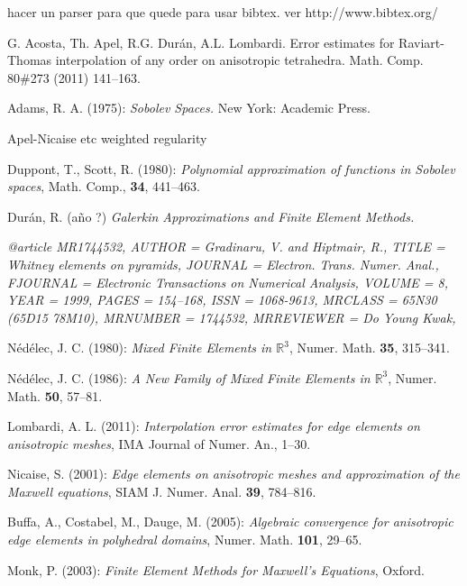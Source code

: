 \begin{thebibliography}{9}
 {\color{red} hacer un parser para que quede para usar bibtex.
ver http://www.bibtex.org/}

 G. Acosta, Th. Apel, R.G. Dur\'an, A.L. Lombardi. Error estimates for Raviart-Thomas interpolation of
any order on anisotropic tetrahedra. Math. Comp. 80\#273 (2011) 141--163. 

Adams, R. A. (1975): \emph{Sobolev Spaces.} New York: Academic Press.

Apel-Nicaise etc weighted regularity 

Duppont, T., Scott, R. (1980): \emph{Polynomial approximation of functions in Sobolev spaces},
Math. Comp., \textbf{34}, 441--463.

Dur\'an, R. (a\~no ?) \emph{Galerkin Approximations and Finite Element Methods.}

\emph{
@article {MR1744532,
    AUTHOR = {Gradinaru, V. and Hiptmair, R.},
     TITLE = {Whitney elements on pyramids},
   JOURNAL = {Electron. Trans. Numer. Anal.},
  FJOURNAL = {Electronic Transactions on Numerical Analysis},
    VOLUME = {8},
      YEAR = {1999},
     PAGES = {154--168},
      ISSN = {1068-9613},
   MRCLASS = {65N30 (65D15 78M10)},
  MRNUMBER = {1744532},
MRREVIEWER = {Do Young Kwak},
}}


N\'ed\'elec, J. C. (1980): \emph{Mixed Finite Elements in $\mathbb{R}^3$}, Numer. Math. \textbf{35},
315--341.

N\'ed\'elec, J. C. (1986): \emph{A New Family of Mixed Finite Elements in $\mathbb{R}^3$}, Numer. Math. 
\textbf{50}, 57--81.

Lombardi, A. L. (2011): \emph{Interpolation error estimates for edge elements on anisotropic meshes}, 
IMA Journal of Numer. An., 1--30.

Nicaise, S. (2001): \emph{Edge elements on anisotropic meshes and approximation of the Maxwell equations},
SIAM J. Numer. Anal. \textbf{39}, 784--816.

Buffa, A., Costabel, M., Dauge, M. (2005): \emph{Algebraic convergence for anisotro\-pic edge elements
in polyhedral domains}, Numer. Math. \textbf{101}, 29--65.

Monk, P. (2003): \emph{Finite Element Methods for Maxwell's Equations}, Oxford.
\end{thebibliography}